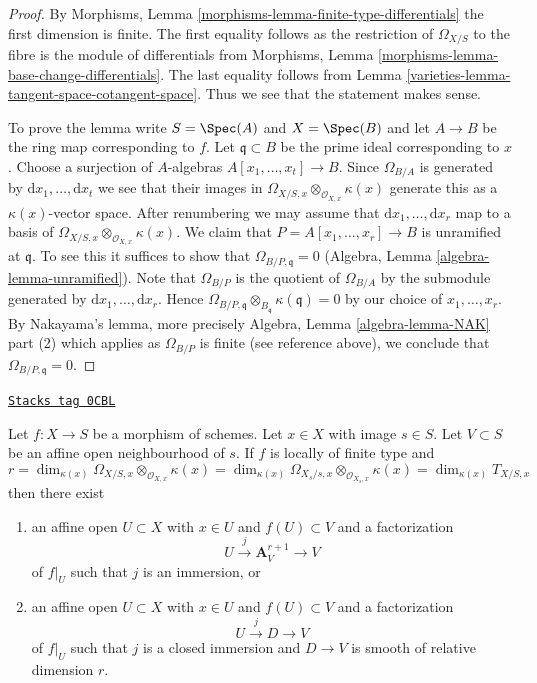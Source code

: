 \begin{proof}

By Morphisms, Lemma \ref{morphisms-lemma-finite-type-differentials}
the first dimension is finite.
The first equality follows as the restriction of
$\Omega_{X/S}$ to the fibre is the module of differentials
from Morphisms, Lemma
\ref{morphisms-lemma-base-change-differentials}.
The last equality follows from Lemma \ref{varieties-lemma-tangent-space-cotangent-space}.
Thus we see that the statement makes sense.

\medskip\noindent
To prove the lemma write $S = \Spec(A)$ and $X = \Spec(B)$ and let
$A \to B$ be the ring map corresponding to $f$. Let $\mathfrak q \subset B$
be the prime ideal corresponding to $x$. Choose a surjection of $A$-algebras
$A[x_1, \ldots, x_t] \to B$. Since $\Omega_{B/A}$ is generated by
$\text{d}x_1, \ldots, \text{d}x_t$ we see that their images in
$\Omega_{X/S, x} \otimes_{\mathcal{O}_{X, x}} \kappa(x)$ generate
this as a $\kappa(x)$-vector space. After renumbering we may assume
that $\text{d}x_1, \ldots, \text{d}x_r$ map to a basis of
$\Omega_{X/S, x} \otimes_{\mathcal{O}_{X, x}} \kappa(x)$.
We claim that $P = A[x_1, \ldots, x_r] \to B$ is unramified at $\mathfrak q$.
To see this it suffices to show that $\Omega_{B/P, \mathfrak q} = 0$
(Algebra, Lemma \ref{algebra-lemma-unramified}).
Note that $\Omega_{B/P}$ is the quotient of $\Omega_{B/A}$ by the
submodule generated by $\text{d}x_1, \ldots, \text{d}x_r$.
Hence
$\Omega_{B/P, \mathfrak q} \otimes_{B_\mathfrak q} \kappa(\mathfrak q) = 0$
by our choice of $x_1, \ldots, x_r$.
By Nakayama's lemma, more precisely Algebra, Lemma \ref{algebra-lemma-NAK}
part (2) which applies as $\Omega_{B/P}$ is finite (see reference above),
we conclude that $\Omega_{B/P, \mathfrak q} = 0$.
\end{proof}

\begin{lemma}
\label{varieties-lemma-immersion-into-affine}
\href{https://stacks.math.columbia.edu/tag/0CBL}{\texttt{Stacks tag 0CBL}}

Let $f : X \to S$ be a morphism of schemes.
Let $x \in X$ with image $s \in S$. Let $V \subset S$ be
an affine open neighbourhood of $s$. If $f$ is locally of
finite type and
$$
r =
\dim_{\kappa(x)} \Omega_{X/S, x} \otimes_{\mathcal{O}_{X, x}} \kappa(x) =
\dim_{\kappa(x)} \Omega_{X_s/s, x} \otimes_{\mathcal{O}_{X_s, x}} \kappa(x) =
\dim_{\kappa(x)} T_{X/S, x}
$$
then there exist
\begin{enumerate}
\item an affine open $U \subset X$ with $x \in U$ and $f(U) \subset V$ and a
factorization
$$
U \xrightarrow{j} \mathbf{A}^{r + 1}_V \to V
$$
of $f|_U$ such that $j$ is an immersion, or
\item an affine open $U \subset X$ with $x \in U$ and $f(U) \subset V$ and a
factorization
$$
U \xrightarrow{j} D \to V
$$
of $f|_U$ such that $j$ is a closed immersion and $D \to V$
is smooth of relative dimension $r$.
\end{enumerate}
\end{lemma}

